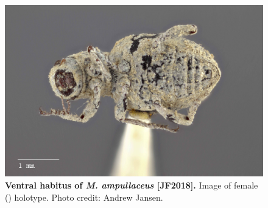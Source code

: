 \documentclass[fleqn,10pt,lineno]{wlpeerj} %
\begin{document}
\begin{figure}[h]
	\begin{sideways}
		\centering
		\includegraphics[height=\textwidth]{figure10.jpg}
	\end{sideways}
	\caption{\textbf{Ventral habitus of \textit{M. ampullaceus} [JF2018].} Image of female (\female) holotype. Photo credit: Andrew Jansen.}
	\label{fig:ampullaceus_F_ventral}
\end{figure}
\end{document}
